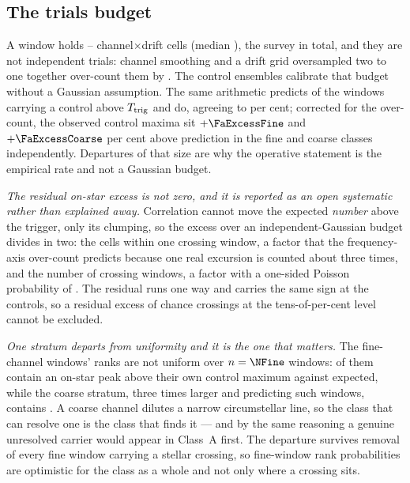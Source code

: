 \subsection{The trials budget}

A window holds \CellsWinMin--\CellsWinMax{} channel$\times$drift cells
(median \CellsWinMed), the survey \CellsTotal{} in total, and they are not
independent trials: channel smoothing and a drift grid oversampled two to
one together over-count them by \FaOverCount. The control ensembles
calibrate that budget without a Gaussian assumption. The same arithmetic
predicts \NCtrlWinExp{} of the \NWindows{} windows carrying a control above
$T_{\rm trig}$ and \NCtrlWinObs{} do, agreeing to \CtrlWinAgreePct{} per
cent; corrected for the over-count, the observed control maxima sit
$+\FaExcessFine$ and $+\FaExcessCoarse$ per cent above prediction in the
fine and coarse classes independently. Departures of that size are why the
operative statement is the empirical rate and not a Gaussian budget.

\emph{The residual on-star excess is not zero, and it is reported as an open
systematic rather than explained away.} Correlation cannot move the expected
\emph{number} above the trigger, only its clumping, so the excess over an
independent-Gaussian budget divides in two: the cells within one crossing
window, a factor \CellsPerCrossRatio{} that the frequency-axis over-count
predicts because one real excursion is counted about three times, and the
number of crossing windows, a factor \CrossWinRatio{} with a one-sided
Poisson probability of \CrossWinPoisson. The residual runs one way and
carries the same sign at the controls, so a residual excess of chance
crossings at the tens-of-per-cent level cannot be excluded.

\emph{One stratum departs from uniformity and it is the one that matters.}
The fine-channel windows' ranks are not uniform over $n=\NFine$ windows:
\NStageOneFine{} of them contain an on-star peak above their own control
maximum against \ExpStageOneFine{} expected, while the coarse stratum, three
times larger and predicting \ExpStageOneCoarse{} such windows, contains
\NStageOneCoarse. A coarse channel dilutes a narrow circumstellar line, so
the class that can resolve one is the class that finds it --- and by the same
reasoning a genuine unresolved carrier would appear in Class~A first. The
departure survives removal of every fine window carrying a stellar crossing,
so fine-window rank probabilities are optimistic for the class as a whole and
not only where a crossing sits.

